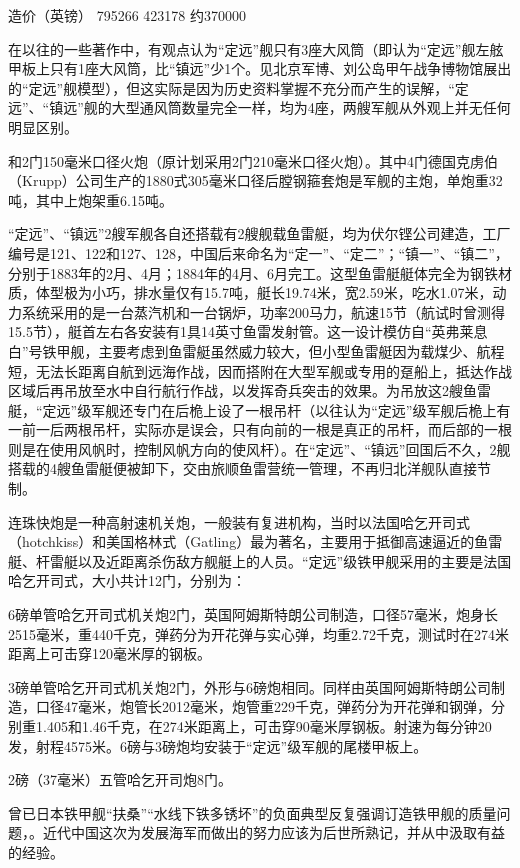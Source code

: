 \documentclass[12pt,UTF8]{ctexbook}
\begin{document}
造价（英镑） 795266 423178 约370000

在以往的一些著作中，有观点认为“定远”舰只有3座大风筒（即认为“定远”舰左舷甲板上只有1座大风筒，比“镇远”少1个。见北京军博、刘公岛甲午战争博物馆展出的“定远”舰模型），但这实际是因为历史资料掌握不充分而产生的误解，“定远”、“镇远”舰的大型通风筒数量完全一样，均为4座，两艘军舰从外观上并无任何明显区别。

和2门150毫米口径火炮（原计划采用2门210毫米口径火炮）。其中4门德国克虏伯（Krupp）公司生产的1880式305毫米口径后膛钢箍套炮是军舰的主炮，单炮重32吨，其中上炮架重6.15吨。

“定远”、“镇远”2艘军舰各自还搭载有2艘舰载鱼雷艇，均为伏尔铿公司建造，工厂编号是121、122和127、128，中国后来命名为“定一”、“定二”；“镇一”、“镇二”，分别于1883年的2月、4月；1884年的4月、6月完工。这型鱼雷艇艇体完全为钢铁材质，体型极为小巧，排水量仅有15.7吨，艇长19.74米，宽2.59米，吃水1.07米，动力系统采用的是一台蒸汽机和一台锅炉，功率200马力，航速15节（航试时曾测得15.5节），艇首左右各安装有1具14英寸鱼雷发射管。这一设计模仿自“英弗莱息白”号铁甲舰，主要考虑到鱼雷艇虽然威力较大，但小型鱼雷艇因为载煤少、航程短，无法长距离自航到远海作战，因而搭附在大型军舰或专用的趸船上，抵达作战区域后再吊放至水中自行航行作战，以发挥奇兵突击的效果。为吊放这2艘鱼雷艇，“定远”级军舰还专门在后桅上设了一根吊杆（以往认为“定远”级军舰后桅上有一前一后两根吊杆，实际亦是误会，只有向前的一根是真正的吊杆，而后部的一根则是在使用风帆时，控制风帆方向的使风杆）。在“定远”、“镇远”回国后不久，2舰搭载的4艘鱼雷艇便被卸下，交由旅顺鱼雷营统一管理，不再归北洋舰队直接节制。

连珠快炮是一种高射速机关炮，一般装有复进机构，当时以法国哈乞开司式（hotchkiss）和美国格林式（Gatling）最为著名，主要用于抵御高速逼近的鱼雷艇、杆雷艇以及近距离杀伤敌方舰艇上的人员。“定远”级铁甲舰采用的主要是法国哈乞开司式，大小共计12门，分别为：

6磅单管哈乞开司式机关炮2门，英国阿姆斯特朗公司制造，口径57毫米，炮身长2515毫米，重440千克，弹药分为开花弹与实心弹，均重2.72千克，测试时在274米距离上可击穿120毫米厚的钢板。

3磅单管哈乞开司式机关炮2门，外形与6磅炮相同。同样由英国阿姆斯特朗公司制造，口径47毫米，炮管长2012毫米，炮管重229千克，弹药分为开花弹和钢弹，分别重1.405和1.46千克，在274米距离上，可击穿90毫米厚钢板。射速为每分钟20发，射程4575米。6磅与3磅炮均安装于“定远”级军舰的尾楼甲板上。


2磅（37毫米）五管哈乞开司炮8门。

曾已日本铁甲舰“扶桑”“水线下铁多锈坏”的负面典型反复强调订造铁甲舰的质量问题，。近代中国这次为发展海军而做出的努力应该为后世所熟记，并从中汲取有益的经验。
\end{document}
